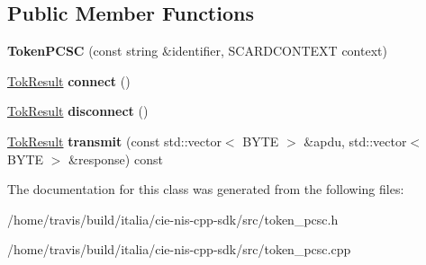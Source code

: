 \subsection*{Public Member Functions}
\begin{DoxyCompactItemize}
\item 
\hypertarget{classnis_1_1implementation_1_1TokenPCSC_ae72b5cf6f97ab41d4a95f87c3a3fa8cc}{{\bfseries Token\-P\-C\-S\-C} (const string \&identifier, S\-C\-A\-R\-D\-C\-O\-N\-T\-E\-X\-T context)}\label{classnis_1_1implementation_1_1TokenPCSC_ae72b5cf6f97ab41d4a95f87c3a3fa8cc}

\item 
\hypertarget{classnis_1_1implementation_1_1TokenPCSC_a7078555ef89f4388fa32b60d56d14437}{\hyperlink{nis__types_8h_a6ef53483e8ce2f8bc58bd1f75b3d0b38}{Tok\-Result} {\bfseries connect} ()}\label{classnis_1_1implementation_1_1TokenPCSC_a7078555ef89f4388fa32b60d56d14437}

\item 
\hypertarget{classnis_1_1implementation_1_1TokenPCSC_af95dd044db07754ff4ee09e186821fa2}{\hyperlink{nis__types_8h_a6ef53483e8ce2f8bc58bd1f75b3d0b38}{Tok\-Result} {\bfseries disconnect} ()}\label{classnis_1_1implementation_1_1TokenPCSC_af95dd044db07754ff4ee09e186821fa2}

\item 
\hypertarget{classnis_1_1implementation_1_1TokenPCSC_a23176a026828460420ea3e9619c7664d}{\hyperlink{nis__types_8h_a6ef53483e8ce2f8bc58bd1f75b3d0b38}{Tok\-Result} {\bfseries transmit} (const std\-::vector$<$ B\-Y\-T\-E $>$ \&apdu, std\-::vector$<$ B\-Y\-T\-E $>$ \&response) const }\label{classnis_1_1implementation_1_1TokenPCSC_a23176a026828460420ea3e9619c7664d}

\end{DoxyCompactItemize}


The documentation for this class was generated from the following files\-:\begin{DoxyCompactItemize}
\item 
/home/travis/build/italia/cie-\/nis-\/cpp-\/sdk/src/token\-\_\-pcsc.\-h\item 
/home/travis/build/italia/cie-\/nis-\/cpp-\/sdk/src/token\-\_\-pcsc.\-cpp\end{DoxyCompactItemize}
